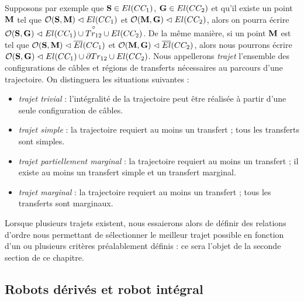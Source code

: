 Supposons par exemple que ${\bf S} \in El(CC_1)$, ${\bf G} \in El(CC_2)$ et 
qu'il existe un point ${\bf M}$ tel que $\mathcal O({\bf S}, {\bf 
M}) \vartriangleleft El(CC_1)$ et $\mathcal O({\bf M}, {\bf G}) 
\vartriangleleft El(CC_2)$, alors on pourra écrire $\mathcal O({\bf S}, {\bf G}) 
\vartriangleleft El(CC_1) \cup \overset{\circ}{Tr_{12}} \cup El(CC_2)$. De la 
 même manière, si un point ${\bf M}$ est tel que $\mathcal O({\bf S}, {\bf M}) 
\vartriangleleft \overline{El}(CC_1)$ et $\mathcal O({\bf M}, {\bf G}) 
\vartriangleleft \overline{El}(CC_2)$, alors nous pourrons écrire $\mathcal 
O({\bf S}, {\bf G}) \vartriangleleft El(CC_1) \cup \partial Tr_{12} \cup 
El(CC_2)$. Nous appellerons {\it trajet} l'ensemble des configurations de 
c\^ables et régions de transferts nécessaires au parcours d'une trajectoire. On 
distinguera les situations suivantes :
\begin{itemize}
 \item {\it trajet trivial} : l'intégralité de la trajectoire peut être 
réalisée à partir d'une seule configuration de câbles.
 \item {\it trajet simple} : la trajectoire requiert au moins un transfert ; 
tous les transferts sont simples.
 \item {\it trajet partiellement marginal} : la trajectoire requiert au moins 
un transfert ; il existe au moins un transfert simple et un transfert marginal.
 \item {\it trajet marginal} : la trajectoire requiert au moins un transfert 
; tous les transferts sont marginaux.
\end{itemize}

Lorsque plusieurs trajets existent, nous essaierons alors de définir 
des relations d'ordre nous permettant de sélectionner le meilleur trajet 
possible en fonction d'un ou plusieurs critères préalablement définis : ce sera 
l'objet de la seconde section de ce chapitre.

\subsection{Robots d\'eriv\'es et robot int\'egral}

